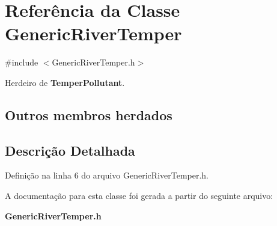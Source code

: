 \section{Referência da Classe Generic\+River\+Temper}
\label{class_generic_river_temper}


{\ttfamily \#include $<$Generic\+River\+Temper.\+h$>$}



Herdeiro de {\bf Temper\+Pollutant}.

\subsection*{Outros membros herdados}


\subsection{Descrição Detalhada}


Definição na linha 6 do arquivo Generic\+River\+Temper.\+h.



A documentação para esta classe foi gerada a partir do seguinte arquivo\+:\begin{DoxyCompactItemize}
\item 
{\bf Generic\+River\+Temper.\+h}\end{DoxyCompactItemize}
